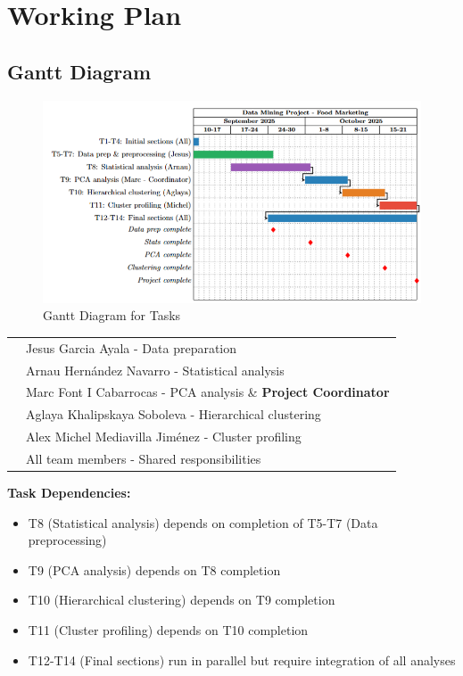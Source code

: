\documentclass[12pt,a4paper]{article}
\begin{document}
\section{Working Plan}
\subsection{Gantt Diagram}

\begin{figure}[H]
    \centering
    \includegraphics[width=1\linewidth]{Imatges/Gantt.png}
    \caption{Gantt Diagram for Tasks}
    \label{fig:gantt}
\end{figure}

\begin{table}[H]
\centering
\begin{tabular}{cl}
\colorbox{JesusGreen}{\phantom{XX}} & Jesus Garcia Ayala - Data preparation \\[0.2cm]
\colorbox{ArnauPurple}{\phantom{XX}} & Arnau Hernández Navarro - Statistical analysis \\[0.2cm]
\colorbox{MarcBlue}{\phantom{XX}} & Marc Font I Cabarrocas - PCA analysis \& \textbf{Project Coordinator} \\[0.2cm]
\colorbox{AglayaOrange}{\phantom{XX}} & Aglaya Khalipskaya Soboleva - Hierarchical clustering \\[0.2cm]
\colorbox{MichelRed}{\phantom{XX}} & Alex Michel Mediavilla Jiménez - Cluster profiling \\[0.2cm]
\colorbox{SharedBlue}{\phantom{XX}} & All team members - Shared responsibilities \\
\end{tabular}
\end{table}


\textbf{\textcolor{secondaryblue}{Task Dependencies:}}
\begin{itemize}[leftmargin=*]
    \item T8 (Statistical analysis) depends on completion of T5-T7 (Data preprocessing)
    \item T9 (PCA analysis) depends on T8 completion 
    \item T10 (Hierarchical clustering) depends on T9 completion
    \item T11 (Cluster profiling) depends on T10 completion
    \item T12-T14 (Final sections) run in parallel but require integration of all analyses
\end{itemize}
\end{document}
